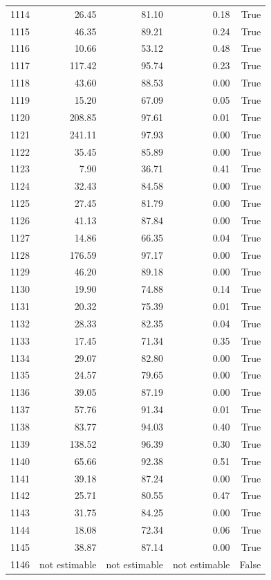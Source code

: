 \begin{longtable}{rrrrr}
1114 & 26.45 & 81.10 & 0.18 & True \\
1115 & 46.35 & 89.21 & 0.24 & True \\
1116 & 10.66 & 53.12 & 0.48 & True \\
1117 & 117.42 & 95.74 & 0.23 & True \\
1118 & 43.60 & 88.53 & 0.00 & True \\
1119 & 15.20 & 67.09 & 0.05 & True \\
1120 & 208.85 & 97.61 & 0.01 & True \\
1121 & 241.11 & 97.93 & 0.00 & True \\
1122 & 35.45 & 85.89 & 0.00 & True \\
1123 & 7.90 & 36.71 & 0.41 & True \\
1124 & 32.43 & 84.58 & 0.00 & True \\
1125 & 27.45 & 81.79 & 0.00 & True \\
1126 & 41.13 & 87.84 & 0.00 & True \\
1127 & 14.86 & 66.35 & 0.04 & True \\
1128 & 176.59 & 97.17 & 0.00 & True \\
1129 & 46.20 & 89.18 & 0.00 & True \\
1130 & 19.90 & 74.88 & 0.14 & True \\
1131 & 20.32 & 75.39 & 0.01 & True \\
1132 & 28.33 & 82.35 & 0.04 & True \\
1133 & 17.45 & 71.34 & 0.35 & True \\
1134 & 29.07 & 82.80 & 0.00 & True \\
1135 & 24.57 & 79.65 & 0.00 & True \\
1136 & 39.05 & 87.19 & 0.00 & True \\
1137 & 57.76 & 91.34 & 0.01 & True \\
1138 & 83.77 & 94.03 & 0.40 & True \\
1139 & 138.52 & 96.39 & 0.30 & True \\
1140 & 65.66 & 92.38 & 0.51 & True \\
1141 & 39.18 & 87.24 & 0.00 & True \\
1142 & 25.71 & 80.55 & 0.47 & True \\
1143 & 31.75 & 84.25 & 0.00 & True \\
1144 & 18.08 & 72.34 & 0.06 & True \\
1145 & 38.87 & 87.14 & 0.00 & True \\
1146 & not estimable & not estimable & not estimable & False \\

\end{longtable}
